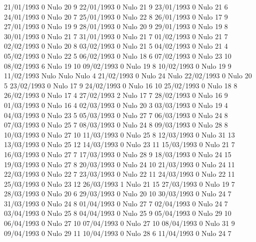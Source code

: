 21/01/1993  0     Nulo    20     9 
22/01/1993  0     Nulo    21     9 
23/01/1993  0     Nulo    21     6 
24/01/1993  0     Nulo    20     7 
25/01/1993  0     Nulo    22     8 
26/01/1993  0     Nulo    17     9 
27/01/1993  0     Nulo    19     9 
28/01/1993  0     Nulo    20     9 
29/01/1993  0     Nulo    19     8 
30/01/1993  0     Nulo    21     7 
31/01/1993  0     Nulo    21     7 
01/02/1993  0     Nulo    21     7 
02/02/1993  0     Nulo    20     8 
03/02/1993  0     Nulo    21     5 
04/02/1993  0     Nulo    21     4 
05/02/1993  0     Nulo    22     5 
06/02/1993  0     Nulo    18     6 
07/02/1993  0     Nulo    23     10 
08/02/1993  6     Nulo    19     10 
09/02/1993  0     Nulo    19     8 
10/02/1993  0     Nulo    19     9 
11/02/1993 Nulo   Nulo   Nulo    4 
21/02/1993  0     Nulo    24    Nulo
22/02/1993  0     Nulo    20     5 
23/02/1993  0     Nulo    17     9 
24/02/1993  0     Nulo    16     10 
25/02/1993  0     Nulo    18     8 
26/02/1993  0     Nulo    17     4 
27/02/1993  2     Nulo    17     7 
28/02/1993  0     Nulo    16     9 
01/03/1993  0     Nulo    16     4 
02/03/1993  0     Nulo    20     3 
03/03/1993  0     Nulo    19     4 
04/03/1993  0     Nulo    23     5 
05/03/1993  0     Nulo    27     7 
06/03/1993  0     Nulo    24     8 
07/03/1993  0     Nulo    25     7 
08/03/1993  0     Nulo    24     8 
09/03/1993  0     Nulo    28     8 
10/03/1993  0     Nulo    27     10 
11/03/1993  0     Nulo    25     8 
12/03/1993  0     Nulo    31     13 
13/03/1993  0     Nulo    25     12 
14/03/1993  0     Nulo    23     11 
15/03/1993  0     Nulo    21     7 
16/03/1993  0     Nulo    27     7 
17/03/1993  0     Nulo    28     9 
18/03/1993  0     Nulo    24     15 
19/03/1993  0     Nulo    27     8 
20/03/1993  0     Nulo    24     10 
21/03/1993  0     Nulo    24     11 
22/03/1993  0     Nulo    22     7 
23/03/1993  0     Nulo    22     11 
24/03/1993  0     Nulo    22     11 
25/03/1993  0     Nulo    23     12 
26/03/1993  1     Nulo    21     15 
27/03/1993  0     Nulo    19     7 
28/03/1993  0     Nulo    20     6 
29/03/1993  0     Nulo    20     10 
30/03/1993  0     Nulo    24     7 
31/03/1993  0     Nulo    24     8 
01/04/1993  0     Nulo    27     7 
02/04/1993  0     Nulo    24     7 
03/04/1993  0     Nulo    25     8 
04/04/1993  0     Nulo    25     9 
05/04/1993  0     Nulo    29     10 
06/04/1993  0     Nulo    27     10 
07/04/1993  0     Nulo    27     10 
08/04/1993  0     Nulo    31     9 
09/04/1993  0     Nulo    29     11 
10/04/1993  0     Nulo    28     6 
11/04/1993  0     Nulo    24     7 
